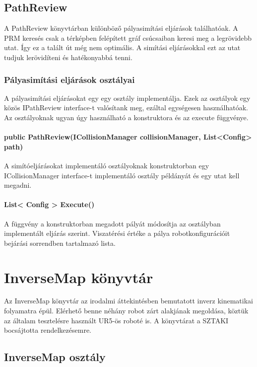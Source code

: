\subsection{PathReview}

A PathReview könyvtárban különböző pályasimítási eljárások találhatóak. A PRM keresés csak a térképben felépített gráf csúcsaiban keresi meg a legrövidebb utat. Így ez a talált út még nem optimális. A simítási eljárásokkal ezt az utat tudjuk lerövidíteni és hatékonyabbá tenni.

\subsubsection*{Pályasimítási eljárások osztályai}

A pályasimítási eljárásokat egy egy osztály implementálja. Ezek az osztályok egy közös IPathReview interface-t valósítank meg, ezáltal egységesen használhatóak. Az osztályoknak ugyan úgy használható a konstruktora és az execute függvénye.

\paragraph{public PathReview(ICollisionManager collisionManager, List<Config> path)}

A simítóeljárásokat implementáló osztályoknak konstruktorban egy ICollisionManager interface-t implementáló osztály példányát és egy utat kell megadni. 

\paragraph{ List< Config > Execute()}

A függvény a konstruktorban megadott pályát módosítja az osztályban implementált eljárás szerint. Viszatérési értéke a pálya robotkonfigurációit  bejárási sorrendben tartalmazó lista.

\section{InverseMap könyvtár}

Az InverseMap könyvtár az irodalmi áttekintésben bemutatott inverz kinematikai folyamatra épül. Elérhető benne néhány robot zárt alakjának megoldása, köztük az általam tesztelésre használt UR5-ös roboté is. A könyvtárat a SZTAKI bocsájtotta rendelkezésemre.

\subsection{InverseMap osztály}

